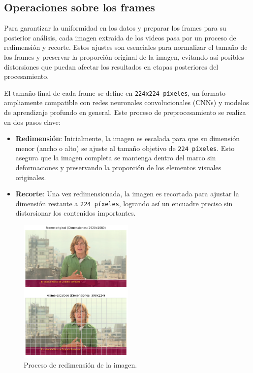 \subsection{Operaciones sobre los frames}

Para garantizar la uniformidad en los datos y preparar los frames para su posterior análisis, cada imagen extraída de los videos pasa por un proceso de redimensión y recorte. Estos ajustes son esenciales para normalizar el tamaño de los frames y preservar la proporción original de la imagen, evitando así posibles distorsiones que puedan afectar los resultados en etapas posteriores del procesamiento.

El tamaño final de cada frame se define en \texttt{224x224 píxeles}, un formato ampliamente compatible con redes neuronales convolucionales (CNNs) y modelos de aprendizaje profundo en general. Este proceso de preprocesamiento se realiza en dos pasos clave:

\begin{itemize}
    \item \textbf{Redimensión}: Inicialmente, la imagen es escalada para que su dimensión menor (ancho o alto) se ajuste al tamaño objetivo de \texttt{224 píxeles}. Esto asegura que la imagen completa se mantenga dentro del marco sin deformaciones y preservando la proporción de los elementos visuales originales.
    \item \textbf{Recorte}: Una vez redimensionada, la imagen es recortada para ajustar la dimensión restante a \texttt{224 píxeles}, logrando así un encuadre preciso sin distorsionar los contenidos importantes. 
\end{itemize}


\begin{figure}[H]
    \centering
    \includegraphics[width=0.50\textwidth]{4/figures/Preprocesamiento_1.png}
    \caption{Proceso de redimensión de la imagen.}
    \label{fig:preproc-resize}
\end{figure}

